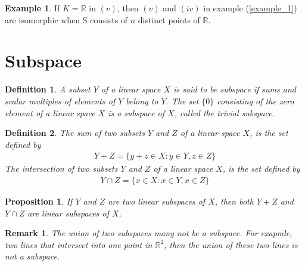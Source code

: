 \documentclass[11pt]{book}
\newtheorem{definition}{Definition}[section]
\newtheorem{proposition}{Proposition}[section]
\newtheorem{remark}{Remark}[section]
\theoremstyle{definition}
\newtheorem{example}{Example}[section]
\numberwithin{equation}{subsection}
\begin{document}
\medskip

\begin{example}
If $K=\mathbb{R}$ in $(v)$, then $(v)$ and $(iv)$ in example (\ref{example_1}) are isomorphic when S
consists of $n$ distinct points of $\mathbb{R}$.
\end{example}

\medskip

\section{Subspace}
\begin{definition}
A subset $Y$ of a linear space $X$ is said to be subspace if sums and scalar multiples of elements of $Y$ belong to $Y$. The set $\{0\}$ consisting of the zero element of a linear space $X$ is a subspace of $X$, called the trivial subspace.
\end{definition}

\medskip

\begin{definition}
The sum of two subsets $Y$ and $Z$ of a linear space $X$, is the set defined by 
\begin{align*}
    Y+Z = \{y+z\in X: y\in Y, z\in Z\}
\end{align*}
The intersection of two subsets $Y$ and $Z$ of a linear space $X$, is the set defined by
\begin{align*}
    Y\cap Z = \{x\in X: x\in Y, x\in Z\}
\end{align*}
\end{definition}

\medskip

\begin{proposition}
If $Y$ and $Z$ are two linear subspaces of $X$, then both $Y+Z$ and $Y\cap Z$ are linear subspaces of $X$.
\end{proposition}
\begin{remark}
The union of two subspaces many not be a subspace. For exapmle, two lines that intersect into one point in $\mathbb{R}^2$, then the union of these two lines is not a subspace.
\end{remark}

\medskip
\end{document}
